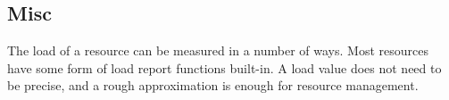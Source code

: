   
\subsection{Misc}

The load of a resource can be measured in a number of ways.  Most
resources have some form of load report functions built-in.
A load value does not need to be precise, and a rough approximation is
enough for resource management.



